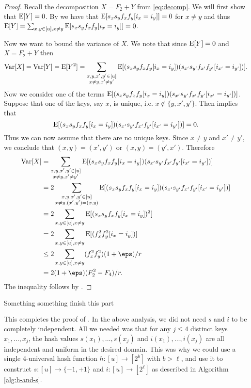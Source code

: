 \begin{proof}
   Recall the decomposition $X=F_2+Y$ from \cref{eq:decomp}.
    We will first show that $\operatorname*{E}[Y] = 0$.
    By  we have that $\operatorname*{E}[s_x s_y f_x f_y [i_x = i_y]] = 0$
    for $x \neq y$ and thus $\operatorname*{E}[Y] = \sum_{x,y\in[u],x\neq y} \operatorname*{E}[s_x s_y f_x f_y [i_x = i_y]] = 0$.

    Now we want to bound the variance of $X$. We note that since $\operatorname*{E}[Y] = 0$ and $X = F_2 + Y$ then
    \begin{align*}
        \operatorname*{Var}[X] = \operatorname*{Var}[Y] = \operatorname*{E}[Y^2]
            = \sum_{\substack{x, y, x', y' \in [u]\\ x \neq y, x' \neq y'}} \operatorname*{E}[(s_x s_y f_x f_y [i_x = i_y])(s_{x'} s_{y'} f_{x'} f_{y'} [i_{x'} = i_{y'}])] .
    \end{align*}
    Now we consider one of the terms $\operatorname*{E}[(s_x s_y f_x f_y [i_x = i_y])(s_{x'} s_{y'} f_{x'} f_{y'} [i_{x'} = i_{y'}])]$.
    Suppose that one of the keys, say $x$, is unique, i.e. $x \not\in \{y, x', y'\}$.
    Then  implies that 
    \[
        \operatorname*{E}[(s_x s_y f_x f_y [i_x = i_y])(s_{x'} s_{y'} f_{x'} f_{y'} [i_{x'} = i_{y'}])] = 0 .
    \]
    Thus we can now assume that there are no unique keys. Since $x \neq y$ and $x' \neq y'$, we conclude
    that $(x, y) = (x', y')$ or $(x, y) = (y', x')$. Therefore
    \begin{align*}
       \Var[X] &= \sum_{\substack{x, y, x', y' \in [u]\\ x \neq y, x' \neq y'}}
                \E[(s_x s_y f_x f_y [i_x = i_y])(s_{x'} s_{y'} f_{x'} f_{y'} [i_{x'} = i_{y'}])]
            \\&= 2 \sum_{\substack{x, y, x', y' \in [u]\\ x \neq y, (x', y') = (x, y)}}
                \E[(s_x s_y f_x f_y [i_x = i_y])(s_{x'} s_{y'} f_{x'} f_{y'} [i_{x'} = i_{y'}])]
            \\&= 2\sum_{x,y\in[u],x\neq y} \E[(s_x s_y f_x f_y[i_x=i_y])^2]
            \\&= 2\sum_{x,y\in[u],x\neq y} \E[(f_x^2f_y^2[i_x=i_y])]
            \\&\le 2\sum_{x,y\in[u],x\neq y} (f_x^2f_y^2)(1 + \eps)/r
            \\&= 2(1 + \eps) (F_2^2-F_4)/r.
    \end{align*}
    The inequality follows by .
\end{proof}
Something something finish this part

This completes the proof of . In the above analysis, we
did not need $s$ and $i$ to be completely independent. All we needed
was that for any $j\leq 4$ distinct keys $x_1,\ldots,x_j$, the hash
values $s(x_1),\ldots,s(x_j)$ and $i(x_1),\ldots,i(x_j)$ are all
independent and uniform in the desired domain. This was why we could
use a single 4-universal hash function $h:[u]\to[2^b]$ with
$b>\ell$, and use it to construct $s:[u]\to\{-1,+1\}$ and
$i:[u]\to[2^\ell]$ as described in Algorithm \ref{alg:h-and-s}.

